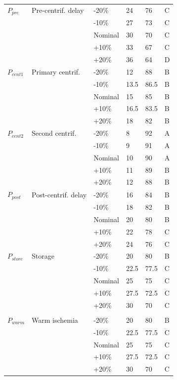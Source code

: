 \documentclass[preprint,12pt]{elsarticle}
\begin{document}
\begin{longtable}{@{}C{1.8cm} L{3.35cm} C{1.55cm} R{1.2cm} R{1.2cm} C{1.1cm}@{}}
\addlinespace[0.35em] \\ \midrule
$P_{pre}$ & Pre-centrif. delay & -20\% & 24 & 76 & C \\
 &  & -10\% & 27 & 73 & C \\
 &  & Nominal & 30 & 70 & C \\
 &  & +10\% & 33 & 67 & C \\
 &  & +20\% & 36 & 64 & D \\
\addlinespace[0.16em]
$P_{cent1}$ & Primary centrif. & -20\% & 12 & 88 & B \\
 &  & -10\% & 13.5 & 86.5 & B \\
 &  & Nominal & 15 & 85 & B \\
 &  & +10\% & 16.5 & 83.5 & B \\
 &  & +20\% & 18 & 82 & B \\
\addlinespace[0.16em]
$P_{cent2}$ & Second centrif. & -20\% & 8 & 92 & A \\
 &  & -10\% & 9 & 91 & A \\
 &  & Nominal & 10 & 90 & A \\
 &  & +10\% & 11 & 89 & B \\
 &  & +20\% & 12 & 88 & B \\
\addlinespace[0.16em]
$P_{post}$ & Post-centrif. delay & -20\% & 16 & 84 & B \\
 &  & -10\% & 18 & 82 & B \\
 &  & Nominal & 20 & 80 & B \\
 &  & +10\% & 22 & 78 & C \\
 &  & +20\% & 24 & 76 & C \\
\addlinespace[0.16em]
$P_{store}$ & Storage & -20\% & 20 & 80 & B \\
 &  & -10\% & 22.5 & 77.5 & C \\
 &  & Nominal & 25 & 75 & C \\
 &  & +10\% & 27.5 & 72.5 & C \\
 &  & +20\% & 30 & 70 & C \\
\addlinespace[0.16em]
\midrule
\addlinespace[0.35em] \\ \midrule
$P_{warm}$ & Warm ischemia & -20\% & 20 & 80 & B \\
 &  & -10\% & 22.5 & 77.5 & C \\
 &  & Nominal & 25 & 75 & C \\
 &  & +10\% & 27.5 & 72.5 & C \\
 &  & +20\% & 30 & 70 & C \\

\end{longtable}
\end{document}

